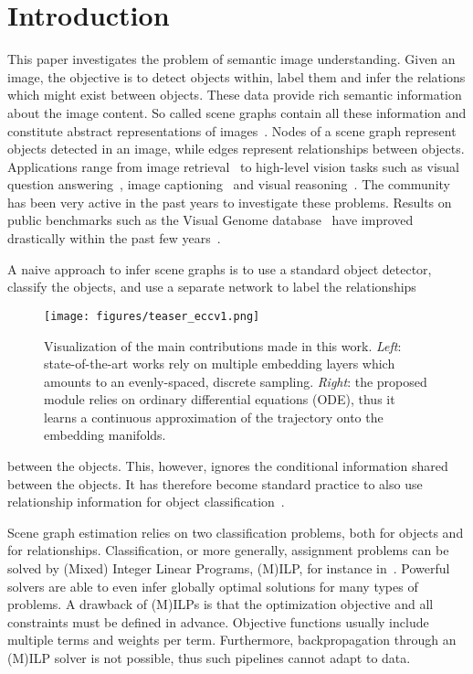 \documentclass[runningheads]{llncs}
\begin{document}
\section{Introduction}

This paper investigates the problem of semantic image understanding. Given an image, the objective is to detect objects within, label them and infer the relations which might exist between objects. These data provide rich semantic information about the image content. 
So called scene graphs contain all these information and constitute abstract representations of images~\cite{johnson2015image}. Nodes of a scene graph represent objects detected in an image, while edges represent relationships between objects. Applications range from image retrieval~\cite{johnson2015image} to high-level vision tasks such as visual question answering~\cite{teney2017graph}, image captioning~\cite{yao2018exploring,yang2019auto} and visual reasoning~\cite{shi2019explainable}. The community has been very active in the past years to investigate these problems. Results on public benchmarks such as the Visual Genome database~\cite{krishna2017visual} have improved drastically within the past few years~\cite{xu2017scene,zellers2018neural,chen2019counterfactual}.



A naive approach to infer scene graphs is to use a standard object detector, classify the objects, and use a separate network to label the relationships 
\begin{figure}[t!]
\centering
\texttt{[image: figures/teaser\_eccv1.png]}
\caption{Visualization of the main contributions made in this work. \textit{Left}: state-of-the-art works rely on multiple embedding layers which amounts to an evenly-spaced, discrete sampling. \textit{Right}: the proposed module relies on ordinary differential equations (ODE), thus it learns a continuous approximation of the trajectory onto the embedding manifolds.}
\label{fig:teaser}
\end{figure}   
between the objects.  
This, however, ignores the conditional information shared between  the objects. 
It has therefore become standard practice to also use relationship information for object classification~\cite{hu2018relation,liu2018structure,li2017scene}.

Scene graph estimation relies on two classification problems, both for objects and for relationships. Classification, or more generally, assignment problems
can be solved by (Mixed) Integer Linear Programs, (M)ILP, for instance  in~\cite{Silberman2012:SupportInference}. Powerful solvers are able to even infer globally optimal solutions for many types of problems. 
A drawback of (M)ILPs is that the optimization objective and all constraints must be defined in advance. Objective functions usually include multiple terms and weights per term. Furthermore,  backpropagation through an (M)ILP solver is not possible, thus such pipelines cannot adapt to data. 
\end{document}
